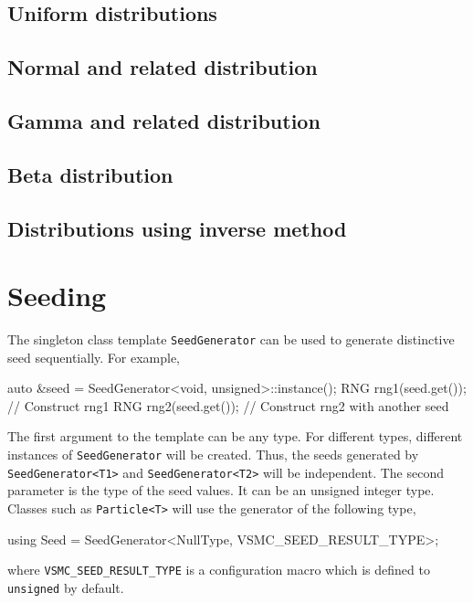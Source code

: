 \subsection{Uniform distributions}
\label{sub:Uniform distributions}

\subsection{Normal and related distribution} 
\label{sub:Normal and related distribuiton} 

\subsection{Gamma and related distribution}
\label{sub:Gamma and related distribution}

\subsection{Beta distribution}
\label{sub:Beta distribution}

\subsection{Distributions using inverse method}
\label{sub:Distributions using inverse method}

\section{Seeding}
\label{sec:Seeding}

The singleton class template \verb|SeedGenerator| can be used to generate
distinctive seed sequentially. For example,
\begin{cppcode}
  auto &seed = SeedGenerator<void, unsigned>::instance();
  RNG rng1(seed.get()); // Construct rng1
  RNG rng2(seed.get()); // Construct rng2 with another seed
\end{cppcode}
The first argument to the template can be any type. For different types,
different instances of \verb|SeedGenerator| will be created. Thus, the seeds
generated by \verb|SeedGenerator<T1>| and \verb|SeedGenerator<T2>| will be
independent. The second parameter is the type of the seed values. It can be an
unsigned integer type. Classes such as \verb|Particle<T>| will use the
generator of the following type,
\begin{cppcode}
  using Seed = SeedGenerator<NullType, VSMC_SEED_RESULT_TYPE>;
\end{cppcode}
where \verb|VSMC_SEED_RESULT_TYPE| is a configuration macro which is defined to
\verb|unsigned| by default.

